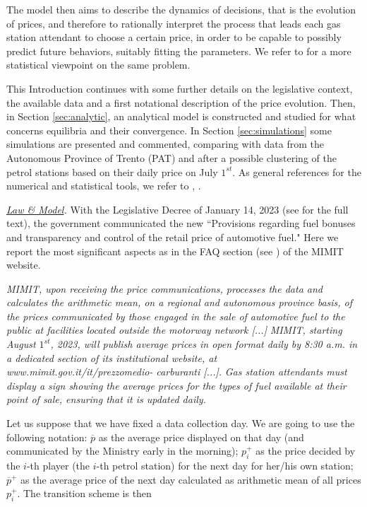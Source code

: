 \documentclass[graybox]{svmult}
\begin{document}
The model then aims to describe the dynamics of decisions, that is
the evolution of prices, and  therefore to rationally interpret the process that
leads each gas station attendant to choose a certain price, in order to be capable to possibly predict future behaviors, suitably fitting the parameters. We refer to \cite{dal} for a more statistical viewpoint on the same problem.


This Introduction continues with some further details on the legislative context, the available data and a first notational description of the price evolution. Then, in Section \ref{sec:analytic}, an analytical model is constructed and studied for what concerns equilibria and their convergence. In Section \ref{sec:simulations} some simulations are presented and commented, comparing with data from the Autonomous Province of Trento (PAT) and after a possible clustering of the petrol stations based on their daily price on July $1^{st}$.
As general references for the numerical and statistical tools, we refer to \cite{nowrig}, \cite{hastibfri}.

{\it \underline{Law \& Model}.}
With the Legislative Decree of January 14, 2023 (see \cite{decretolegge} for the full text), the government
communicated the new ``Provisions regarding fuel bonuses and transparency
and control of the retail price of automotive fuel." 
Here we report the most significant aspects as in the FAQ section
(see \cite{faq}) of the MIMIT website.

{\it MIMIT, upon receiving the price
communications, processes the data and calculates the arithmetic mean, on a regional
and autonomous province basis, of the prices communicated by those engaged in the
sale of automotive fuel to the public at facilities
located outside the motorway network [...]}
{\it MIMIT, starting August $1^{st}$, 2023, will publish average prices in open format daily by 8:30 a.m. in a dedicated section of its institutional website, at www.mimit.gov.it/it/prezzomedio-
carburanti [...].}
{\it Gas station attendants
must display a sign showing the average prices
for the types of fuel available at their point of sale,
ensuring that it is updated daily.}

Let us suppose that we have fixed a data collection day. We are going to use the following notation: $\overline p$ as the average price displayed on that day (and communicated by the Ministry early in the morning); $p_i^+$ as the price decided by the $i$-th player (the $i$-th petrol station) for the next day for her/his own station; $\overline p^+$ as the average price of the next day calculated as arithmetic mean of all prices $p_i^+$. The transition scheme is then
\end{document}
